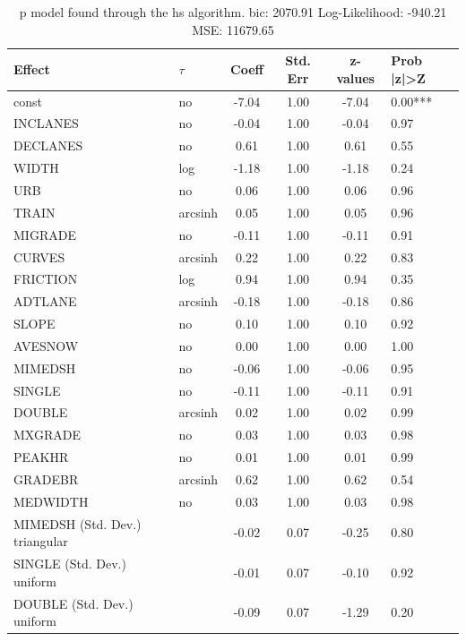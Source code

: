 \begin{table}
	\caption{p model found through the hs algorithm. bic: 2070.91 Log-Likelihood: -940.21 MSE: 11679.65}
	\begin{center}
		\begin{tabular}{|l|l|c|c|c|l|}
			\hline
			Effect & $\tau$ & Coeff & Std. Err & z-values & Prob |z|>Z \\
			\hline
			const & no & -7.04 & 1.00 & -7.04 & 0.00*** \\
			\hline
			INCLANES & no & -0.04 & 1.00 & -0.04 & 0.97 \\
			\hline
			DECLANES & no & 0.61 & 1.00 & 0.61 & 0.55 \\
			\hline
			WIDTH & log & -1.18 & 1.00 & -1.18 & 0.24 \\
			\hline
			URB & no & 0.06 & 1.00 & 0.06 & 0.96 \\
			\hline
			TRAIN & arcsinh & 0.05 & 1.00 & 0.05 & 0.96 \\
			\hline
			MIGRADE & no & -0.11 & 1.00 & -0.11 & 0.91 \\
			\hline
			CURVES & arcsinh & 0.22 & 1.00 & 0.22 & 0.83 \\
			\hline
			FRICTION & log & 0.94 & 1.00 & 0.94 & 0.35 \\
			\hline
			ADTLANE & arcsinh & -0.18 & 1.00 & -0.18 & 0.86 \\
			\hline
			SLOPE & no & 0.10 & 1.00 & 0.10 & 0.92 \\
			\hline
			AVESNOW & no & 0.00 & 1.00 & 0.00 & 1.00 \\
			\hline
			MIMEDSH & no & -0.06 & 1.00 & -0.06 & 0.95 \\
			\hline
			SINGLE & no & -0.11 & 1.00 & -0.11 & 0.91 \\
			\hline
			DOUBLE & arcsinh & 0.02 & 1.00 & 0.02 & 0.99 \\
			\hline
			MXGRADE & no & 0.03 & 1.00 & 0.03 & 0.98 \\
			\hline
			PEAKHR & no & 0.01 & 1.00 & 0.01 & 0.99 \\
			\hline
			GRADEBR & arcsinh & 0.62 & 1.00 & 0.62 & 0.54 \\
			\hline
			MEDWIDTH & no & 0.03 & 1.00 & 0.03 & 0.98 \\
			\hline
			MIMEDSH (Std. Dev.) triangular &  & -0.02 & 0.07 & -0.25 & 0.80 \\
			\hline
			SINGLE (Std. Dev.) uniform &  & -0.01 & 0.07 & -0.10 & 0.92 \\
			\hline
			DOUBLE (Std. Dev.) uniform &  & -0.09 & 0.07 & -1.29 & 0.20 \\

\end{tabular}
\end{center}
\end{table}
